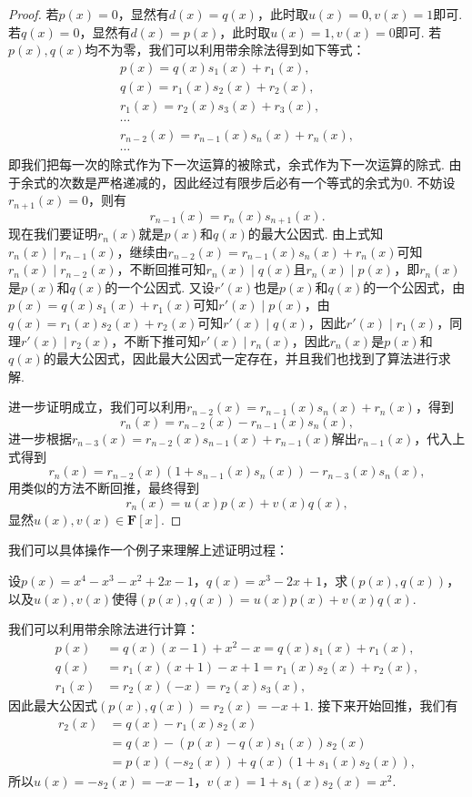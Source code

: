 \begin{proof}
    若$p(x)=0$，显然有$d(x)=q(x)$，此时取$u(x)=0,v(x)=1$即可. 若$q(x)=0$，显然有$d(x)=p(x)$，此时取$u(x)=1,v(x)=0$即可. 若$p(x),q(x)$均不为零，我们可以利用带余除法得到如下等式：
    \begin{gather*}
        p(x)=q(x)s_1(x)+r_1(x),\\
        q(x)=r_1(x)s_2(x)+r_2(x),\\
        r_1(x)=r_2(x)s_3(x)+r_3(x),\\
        \cdots\\
        r_{n-2}(x)=r_{n-1}(x)s_n(x)+r_n(x),\\
        \cdots
    \end{gather*}
    即我们把每一次的除式作为下一次运算的被除式，余式作为下一次运算的除式. 由于余式的次数是严格递减的，因此经过有限步后必有一个等式的余式为$0$. 不妨设$r_{n+1}(x)=0$，则有
    \[r_{n-1}(x)=r_n(x)s_{n+1}(x).\]
    现在我们要证明$r_n(x)$就是$p(x)$和$q(x)$的最大公因式. 由上式知$r_n(x)\mid r_{n-1}(x)$，继续由$r_{n-2}(x)=r_{n-1}(x)s_n(x)+r_n(x)$可知$r_n(x)\mid r_{n-2}(x)$，不断回推可知$r_n(x)\mid q(x)$且$r_n(x)\mid p(x)$，即$r_n(x)$是$p(x)$和$q(x)$的一个公因式. 又设$r'(x)$也是$p(x)$和$q(x)$的一个公因式，由$p(x)=q(x)s_1(x)+r_1(x)$可知$r'(x)\mid p(x)$，由$q(x)=r_1(x)s_2(x)+r_2(x)$可知$r'(x)\mid q(x)$，因此$r'(x)\mid r_1(x)$，同理$r'(x)\mid r_2(x)$，不断下推可知$r'(x)\mid r_n(x)$，因此$r_n(x)$是$p(x)$和$q(x)$的最大公因式，因此最大公因式一定存在，并且我们也找到了算法进行求解.

    进一步证明成立，我们可以利用$r_{n-2}(x)=r_{n-1}(x)s_n(x)+r_n(x)$，得到
    \[r_n(x)=r_{n-2}(x)-r_{n-1}(x)s_n(x),\]
    进一步根据$r_{n-3}(x)=r_{n-2}(x)s_{n-1}(x)+r_{n-1}(x)$解出$r_{n-1}(x)$，代入上式得到
    \[r_n(x)=r_{n-2}(x)(1+s_{n-1}(x)s_n(x))-r_{n-3}(x)s_n(x),\]
    用类似的方法不断回推，最终得到
    \[r_n(x)=u(x)p(x)+v(x)q(x),\]
    显然$u(x),v(x)\in\mathbf{F}[x]$.
\end{proof}

我们可以具体操作一个例子来理解上述证明过程：
\begin{example}{}{}
    设$p(x)=x^4-x^3-x^2+2x-1$，$q(x)=x^3-2x+1$，求$(p(x),q(x))$，以及$u(x),v(x)$使得$(p(x),q(x))=u(x)p(x)+v(x)q(x)$.
\end{example}
\begin{solution}
    我们可以利用带余除法进行计算：
    \begin{align*}
        p(x)   & =q(x)(x-1)+x^2-x=q(x)s_1(x)+r_1(x),   \\
        q(x)   & =r_1(x)(x+1)-x+1=r_1(x)s_2(x)+r_2(x), \\
        r_1(x) & =r_2(x)(-x)=r_2(x)s_3(x),
    \end{align*}
    因此最大公因式$(p(x),q(x))=r_2(x)=-x+1$. 接下来开始回推，我们有
    \begin{align*}
        r_2(x) & =q(x)-r_1(x)s_2(x)                   \\
               & =q(x)-(p(x)-q(x)s_1(x))s_2(x)        \\
               & =p(x)(-s_2(x))+q(x)(1+s_1(x)s_2(x)),
    \end{align*}
    所以$u(x)=-s_2(x)=-x-1$，$v(x)=1+s_1(x)s_2(x)=x^2$.
\end{solution}

